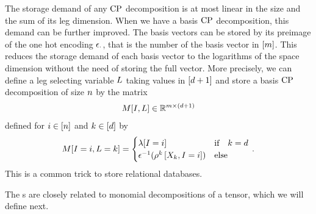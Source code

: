 \begin{remark}
    \label{rem:matStorageBas}
    The storage demand of any $\mathrm{CP}$ decomposition is at most linear in the size and the sum of its leg dimension.
    When we have a basis $\mathrm{CP}$ decomposition, this demand can be further improved.
    The basis vectors can be stored by its preimage of the one hot encoding $\epsilon_{\cdot}$, that is the number of the basis vector in $[m]$.
    This reduces the storage demand of each basis vector to the logarithms of the space dimension without the need of storing the full vector.
    More precisely, we can define a leg selecting variable $L$ taking values in $[d+1]$ and store a basis $\mathrm{CP}$ decomposition of size $n$ by the matrix
    \begin{align*}
        M[I,L] \in \mathbb{R}^{m \times (d+1)}
    \end{align*}
    defined for $i\in[n]$ and $k\in[d]$ by
    \begin{align*}
        \matrixat{\inddecvar,\selvariable=\atomenumerator} =
        \begin{cases}
            \scalarcoreat{\inddecvar} & \text{if} \quad \atomenumerator = \catorder \\
            \invonehotmapof{\legcoreofat{\atomenumerator}{\catvariableof{\atomenumerator},\indexeddecvariable}} & \text{else} \\%
        \end{cases} \, .
    \end{align*}
    This is a common trick to store relational databases.
\end{remark}



The \basplusDecomposition{}s are closely related to monomial decompositions of a tensor, which we will define next.

